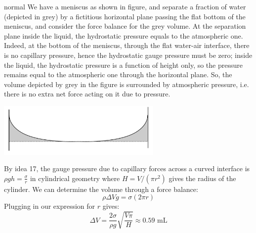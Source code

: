 \begin{solution}{normal}
We have a meniscus as shown in figure, and separate a
fraction of water (depicted in grey) by a fictitious horizontal plane passing the flat bottom of the meniscus, and consider the force balance for the grey volume. At the
separation plane inside the liquid, the hydrostatic pressure
equals to the atmospheric one. Indeed, at the bottom of
the meniscus, through the flat water-air interface, there is
no capillary pressure, hence the hydrostatic gauge pressure
must be zero; inside the liquid, the hydrostatic pressure is
a function of height only, so the pressure remains equal
to the atmospheric one through the horizontal plane. So,
the volume depicted by grey in the figure is surrounded by
atmospheric pressure, i.e. there is no extra net force acting
on it due to pressure.
\begin{center}
    \includegraphics[width=8cm]{pr26.png}
\end{center}
By idea 17, the  gauge pressure due to capillary forces across a curved interface is $\rho gh = \frac{\sigma}{r}$ in cylindrical geometry where $H=V/(\pi r^2)$ gives the radius of the cylinder. We can determine the volume through a force balance:
$$\rho \Delta Vg=\sigma (2\pi r)$$
Plugging in our expression for $r$ gives:
$$\Delta V = \frac{2\sigma}{\rho g}\sqrt{\frac{V\pi}{H}} \approx 0.59 \text{ mL}$$
\end{solution}